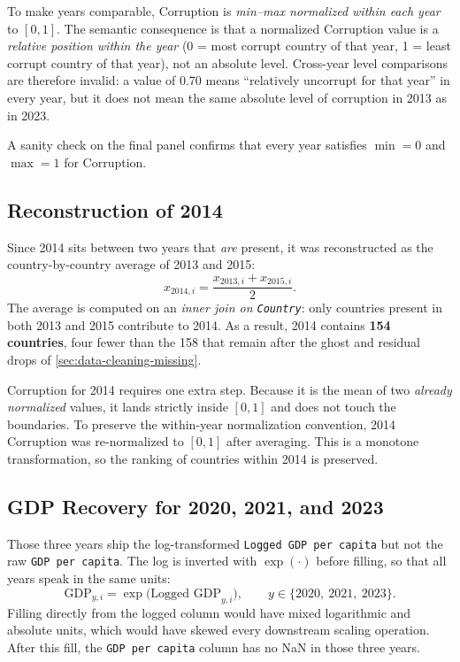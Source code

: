 To make years comparable, Corruption is \emph{min--max normalized within each year} to $[0, 1]$. The semantic consequence is that a normalized Corruption value is a \emph{relative position within the year} (0 = most corrupt country of that year, 1 = least corrupt country of that year), not an absolute level. Cross-year level comparisons are therefore invalid: a value of 0.70 means ``relatively uncorrupt for that year'' in every year, but it does not mean the same absolute level of corruption in 2013 as in 2023.

A sanity check on the final panel confirms that every year satisfies $\min = 0$ and $\max = 1$ for Corruption.

\subsection{Reconstruction of 2014}
\label{sec:data-cleaning-2014}

Since 2014 sits between two years that \emph{are} present, it was reconstructed as the country-by-country average of 2013 and 2015:
\[
x_{2014,i} = \frac{x_{2013,i} + x_{2015,i}}{2}.
\]
The average is computed on an \emph{inner join on \texttt{Country}}: only countries present in both 2013 and 2015 contribute to 2014. As a result, 2014 contains \textbf{154 countries}, four fewer than the 158 that remain after the ghost and residual drops of \cref{sec:data-cleaning-missing}.

Corruption for 2014 requires one extra step. Because it is the mean of two \emph{already normalized} values, it lands strictly inside $[0,1]$ and does not touch the boundaries. To preserve the within-year normalization convention, 2014 Corruption was re-normalized to $[0,1]$ after averaging. This is a monotone transformation, so the ranking of countries within 2014 is preserved.

\subsection{GDP Recovery for 2020, 2021, and 2023}
\label{sec:data-cleaning-gdp}

Those three years ship the log-transformed \texttt{Logged\ GDP\ per\ capita} but not the raw \texttt{GDP\ per\ capita}. The log is inverted with $\exp(\cdot)$ before filling, so that all years speak in the same units:
\[
\text{GDP}_{y,i} = \exp\!\big(\text{Logged GDP}_{y,i}\big), \qquad y \in \{2020,\ 2021,\ 2023\}.
\]
Filling directly from the logged column would have mixed logarithmic and absolute units, which would have skewed every downstream scaling operation. After this fill, the \texttt{GDP\ per\ capita} column has no NaN in those three years.

